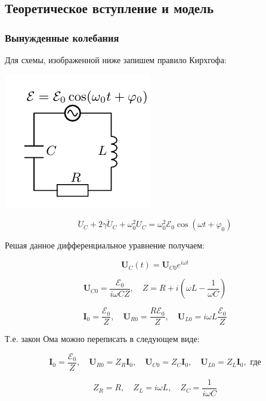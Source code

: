 \documentclass[a4paper, 12pt]{article}%
\begin{document}
\subsection{Теоретическое вступление и модель}

\subsubsection{Вынужденные колебания}

Для схемы, изображенной ниже запишем правило Кирхгофа:

\begin{center}

    \includegraphics[scale=0.65]{pics/theory1.png} \\

\end{center}

\[
\ddot{U}_{C}+2 \gamma \dot{U}_{C}+\omega_{0}^{2} U_{C}=\omega_{0}^{2} \mathcal{E}_{0} \cos \left(\omega t+\varphi_{0}\right)
\]

Решая данное дифференциальное уравнение получаем:

\[ \boldsymbol{U}_{C}(t)=\boldsymbol{U}_{C 0} e^{i \omega t} \]

\[ \boldsymbol{U}_{C 0}=\frac{\mathcal{E}_{0}}{i \omega C Z}, \quad Z=R+i\left(\omega L-\frac{1}{\omega C}\right) \]

\[ \boldsymbol{I}_{0}=\frac{\mathcal{E}_{0}}{Z}, \quad \boldsymbol{U}_{R 0}=\frac{R \mathcal{E}_{0}}{Z}, \quad \boldsymbol{U}_{L 0}=i \omega L \frac{\mathcal{E}_{0}}{Z} \]

Т.е. закон Ома можно переписать в следующем виде:

\[ \boldsymbol{I}_{0}=\frac{\mathcal{E}_{0}}{Z}, \quad \boldsymbol{U}_{R 0}=Z_{R} \boldsymbol{I}_{0}, \quad \boldsymbol{U}_{C 0}=Z_{C} \boldsymbol{I}_{0}, \quad \boldsymbol{U}_{L 0}=Z_{L} \boldsymbol{I}_{0} , \text{ где}\]

\[ Z_{R}=R, \quad Z_{L}=i \omega L, \quad Z_{C}=\frac{1}{i \omega C} \]
\end{document}
